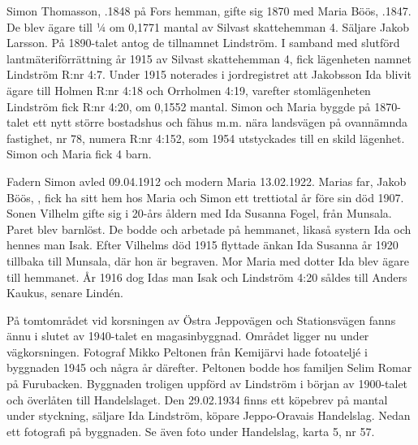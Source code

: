 %
Simon Thomasson, .1848 på Fors hemman, gifte sig 1870 med	Maria Böös, .1847. De blev ägare till ¼ om 0,1771 mantal av Silvast skattehemman 4. Säljare Jakob Larsson. På 1890-talet antog de tillnamnet Lindström. I samband med slutförd lantmäteriförrättning år 1915 av Silvast skattehemman 4, fick lägenheten namnet Lindström R:nr 4:7. Under 1915 noterades i jordregistret att Jakobsson Ida blivit ägare till Holmen R:nr 4:18 och Orrholmen 4:19, varefter stomlägenheten Lindström fick R:nr 4:20, om 0,1552 mantal. Simon och Maria byggde på 1870-talet ett nytt större bostadshus och fähus m.m. nära landsvägen på ovannämnda fastighet, nr 78, numera R:nr 4:152, som 1954 utstyckades till en skild lägenhet. Simon och Maria fick 4 barn.
\begin{jhchildren}
  \item {}
  \item {}
  \item {}
  \item {}
\end{jhchildren}
Fadern Simon avled 09.04.1912 och modern Maria 13.02.1922. Marias far, Jakob Böös, , fick ha sitt hem hos Maria och Simon ett trettiotal år före sin död 1907. Sonen Vilhelm gifte sig i 20-års åldern med Ida Susanna Fogel, från Munsala. Paret blev barnlöst. De bodde och arbetade på hemmanet, likaså systern Ida och hennes man Isak. Efter Vilhelms död 1915 flyttade änkan Ida Susanna år 1920 tillbaka till Munsala, där hon är begraven. Mor Maria med dotter Ida blev ägare till hemmanet. År 1916 dog Idas man Isak och Lindström 4:20 såldes till Anders Kaukus, senare Lindén.



På tomtområdet vid korsningen av Östra Jeppovägen och Stationsvägen fanns ännu i slutet av 1940-talet en magasinbyggnad. Området ligger nu under vägkorsningen. Fotograf Mikko Peltonen från Kemijärvi hade fotoateljé i byggnaden 1945 och några år därefter. Peltonen bodde hos familjen Selim Romar på Furubacken. Byggnaden troligen uppförd av Lindström i början av 1900-talet och överlåten till Handelslaget. Den 29.02.1934 finns ett köpebrev på mantal under styckning, säljare Ida Lindström, köpare Jeppo-Oravais Handelslag. Nedan ett fotografi på byggnaden. Se även foto under Handelslag, karta 5, nr 57.

